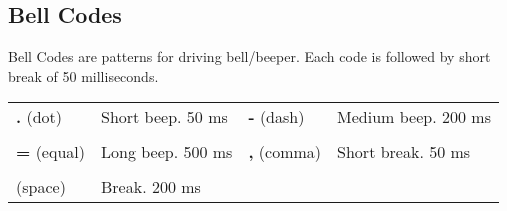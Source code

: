 \subsection{Bell Codes}

Bell Codes are patterns for driving bell/beeper. Each code is followed by short break of 50 milliseconds.

\begin{tabularx}{\textwidth}{l X l X}
	\textbf{.} (dot) & Short beep. 50 ms & \textbf{-} (dash) & Medium beep. 200 ms
	\\ \\
	\textbf{=} (equal) & Long beep. 500 ms & \textbf{,} (comma) & Short break. 50 ms
	\\ \\
	(space) & Break. 200 ms
\end{tabularx}
